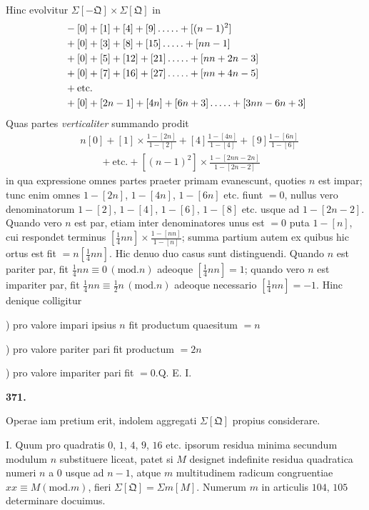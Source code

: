 Hinc evolvitur $\Sigma[-\mathfrak{Q}]\times\Sigma[\mathfrak{Q}]$ in
\[
\begin{aligned}
&-[0]+[1]+[4]+[9]\mathinner{.\,.\,.\,.\,.}+[(n-1)^2]\\
&+[0]+[3]+[8]+[15]\mathinner{.\,.\,.\,.\,.}+[nn-1]\\
&+[0]+[5]+[12]+[21]\mathinner{.\,.\,.\,.\,.}+[nn+2n-3]\\
&+[0]+[7]+[16]+[27]\mathinner{.\,.\,.\,.\,.}+[nn+4n-5]\\
&+\text{etc.}\\
&+[0]+[2n-1]+[4n]+[6n+3]\mathinner{.\,.\,.\,.\,.}+[3nn-6n+3]
\end{aligned}
\]
Quas partes \textit{verticaliter} summando prodit
\[
\begin{aligned}
&n[0]+[1]\times\frac{1-[2n]}{1-[2]}+[4]\frac{1-[4n]}{1-[4]}+[9]\frac{1-[6n]}{1-[6]}\\
&\qquad+\text{etc.}+[(n-1)^2]\times\frac{1-[2nn-2n]}{1-[2n-2]}
\end{aligned}
\]
in qua expressione omnes partes praeter primam evanescunt, quoties $n$ est impar; tunc enim omnes $1-[2n]$, $1-[4n]$, $1-[6n]$ etc. fiunt $=0$, nullus vero denominatorum $1-[2]$, $1-[4]$, $1-[6]$, $1-[8]$ etc. usque ad $1-[2n-2]$. Quando vero $n$ est par, etiam inter denominatores unus est $=0$ puta $1-[n]$, cui respondet terminus $[\frac14nn]\times\frac{1-[nn]}{1-[n]}$; summa partium autem ex quibus hic ortus est fit $=n[\frac14nn]$. Hic denuo duo casus sunt distinguendi. Quando $n$ est pariter par, fit $\frac14nn\equiv0\, (\mathrm{mod}.n)$ adeoque $[\frac14nn]=1$; quando vero $n$ est impariter par, fit $\frac14nn\equiv\frac12n\, (\mathrm{mod}.n)$ adeoque necessario $[\frac14nn]=-1$. Hinc denique colligitur
\par{}) pro valore impari ipsius $n$ fit productum quaesitum $=n$
\par{}) pro valore pariter pari fit productum $=2n$
\par{}) pro valore impariter pari fit $=0$.\quad Q. E. I.
\par\medskip{}\centerline{\textbf{371.}}\nobreak\smallskip
Operae iam pretium erit, indolem aggregati $\Sigma[\mathfrak{Q}]$ propius considerare.
\par I. Quum pro quadratis $0$, $1$, $4$, $9$, $16$ etc. ipsorum residua minima secundum modulum $n$ substituere liceat, patet si $M$ designet indefinite residua quadratica numeri $n$ a $0$ usque ad $n-1$, atque $m$ multitudinem radicum congruentiae $xx\equiv M(\mathrm{mod}.m)$, fieri $\Sigma[\mathfrak{Q}]=\Sigma m[M]$. Numerum $m$ in articulis $104$, $105$ determinare docuimus.

